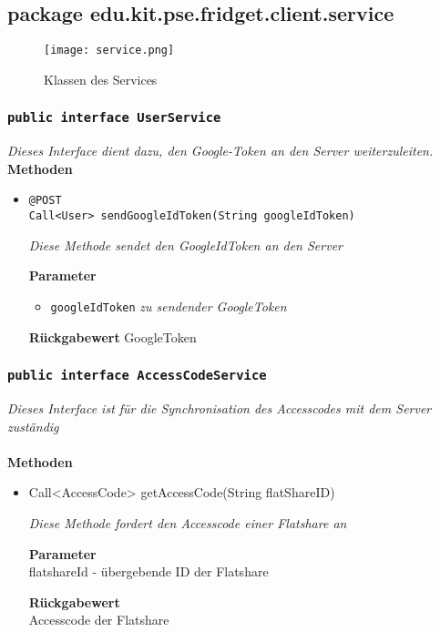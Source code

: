 
\subsection{package edu.kit.pse.fridget.client.service}
\begin{figure}[H]
	       \centering
	       \texttt{[image: service.png]}
	       \caption{Klassen des Services}
	      \end{figure}	
	\subsubsection{\texttt{public interface UserService}}
\textit{Dieses Interface dient dazu, den Google-Token an den Server weiterzuleiten.}\\

	\textbf{Methoden}
		\begin{itemize}

      \item\texttt{{@POST\\ Call<User> sendGoogleIdToken(String googleIdToken)}}

		\textit{Diese Methode sendet den GoogleIdToken an den Server}

		\textbf{Parameter}
		\begin{itemize}
			\item\texttt{googleIdToken}
			\textit{zu sendender GoogleToken}
		\end{itemize}
	
		\textbf{Rückgabewert}
		GoogleToken
	

	 \end{itemize}

	\subsubsection{\texttt{public interface AccessCodeService}}
\textit{Dieses Interface ist für die Synchronisation des Accesscodes mit dem Server zuständig }\\
\\
	\textbf{Methoden} \\
		\begin{itemize}
		\item{Call<AccessCode> getAccessCode(String flatShareID)}

		\textit{Diese Methode fordert den Accesscode einer Flatshare an}

		\textbf{Parameter} \\
	flatshareId - übergebende ID der Flatshare

		\textbf{Rückgabewert} \\
	Accesscode der Flatshare


	 \end{itemize}

